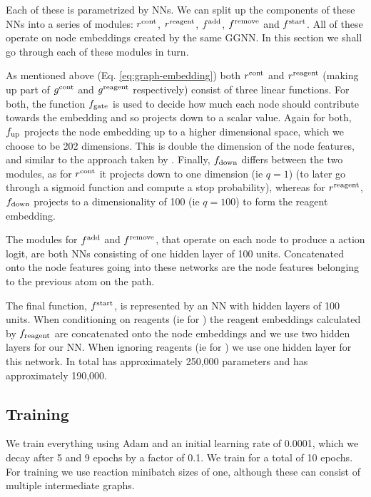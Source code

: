 Each of these is parametrized by NNs. We can split up the components of these NNs into a series of modules: $r^{\textrm{cont}}$, $r^{\textrm{reagent}}$, $f^{\textrm{add}}$, $f^{\textrm{remove}}$ and $f^{\textrm{start}}$. 
All of these operate on node embeddings created by the same GGNN.
 In this section we shall go through each of these modules in turn.




As mentioned above (Eq. \ref{eq:graph-embedding}) both $r^{\textrm{cont}}$ and $r^{\textrm{reagent}}$ (making up part of $g^{\textrm{cont}}$ and $g^{\textrm{reagent}}$ respectively) consist of three
linear functions. 
For  both, the function $f_\textrm{gate}$ is used to decide how much each node should contribute towards the embedding and so projects down to a scalar value.
Again for both, $f_\textrm{up}$ projects the node embedding up to a higher dimensional space, which we choose to be 202 dimensions. 
This is double the dimension of the node features, and similar to the approach taken by \citet[\S B.1]{li2018learning}.
Finally, $f_\textrm{down}$ differs between the two modules, as for $r^{\textrm{cont}}$ it projects down to one dimension (ie $q=1$) (to later go through a sigmoid function and compute a stop probability), whereas for  $r^{\textrm{reagent}}$, $f_\textrm{down}$ projects  to a dimensionality of 100 (ie $q=100$) to form the reagent embedding.


The modules for $f^{\textrm{add}}$ and $f^{\textrm{remove}}$, that operate on each node to produce a action logit, are both NNs consisting of one hidden layer of 100 units. 
Concatenated onto the node features going into these networks are the node features belonging to the previous atom on the path.



The final function, $f^{\textrm{start}}$, is represented by an NN with hidden layers of 100 units. 
When conditioning on reagents (ie for
 \ourModelR
 )
  the reagent embeddings calculated by $f_{\textrm{reagent}}$ are concatenated onto the node embeddings and we use two hidden layers for our NN. When ignoring reagents (ie for \ourModelIR) we use one hidden layer for this network. In total \ourModelR has approximately 250,000 parameters and \ourModelIR has approximately 190,000.

\subsection{Training}

We train everything using Adam \citep{kingma2014adam} and an initial learning rate of 0.0001, which we decay after 5 and 9 epochs by a factor of 0.1. 
We train for a total of 10 epochs.
For training we use reaction minibatch sizes of one, although these can consist of multiple intermediate graphs.






